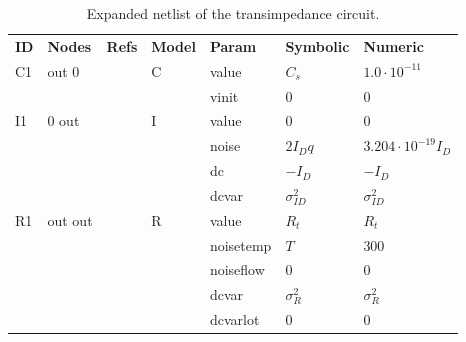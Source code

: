 \begin{table}[H]
\centering
\begin{tabular}[c]{lllllll}
\textbf{ID} & \textbf{Nodes} & \textbf{Refs} & \textbf{Model} & \textbf{Param} & \textbf{Symbolic} & \textbf{Numeric} \\ 
\rowcolor{myyellow}
\small{C1} &\small{out 0 } & &\small{C} &\small{value} &$C_{s}$ &$1.0 \cdot 10^{-11}$ \\ 
 & & & &\small{vinit} &$0$ &$0$ \\ 
\rowcolor{myyellow}
\small{I1} &\small{0 out } & &\small{I} &\small{value} &$0$ &$0$ \\ 
 & & & &\small{noise} &$2 I_{D} q$ &$3.204 \cdot 10^{-19} I_{D}$ \\ 
\rowcolor{myyellow}
 & & & &\small{dc} &$- I_{D}$ &$- I_{D}$ \\ 
 & & & &\small{dcvar} &$\sigma_{ID}^{2}$ &$\sigma_{ID}^{2}$ \\ 
\rowcolor{myyellow}
\small{R1} &\small{out out } & &\small{R} &\small{value} &$R_{t}$ &$R_{t}$ \\ 
 & & & &\small{noisetemp} &$T$ &$300$ \\ 
\rowcolor{myyellow}
 & & & &\small{noiseflow} &$0$ &$0$ \\ 
 & & & &\small{dcvar} &$\sigma_{R}^{2}$ &$\sigma_{R}^{2}$ \\ 
\rowcolor{myyellow}
 & & & &\small{dcvarlot} &$0$ &$0$ \\ 
\end{tabular}
\caption{Expanded netlist of the transimpedance circuit.}
\label{table-elements}
\end{table}

